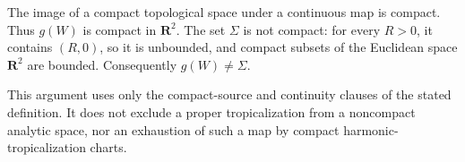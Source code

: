 The image of a compact topological space under a continuous map is compact.
Thus \(g(W)\) is compact in \(\mathbf R^2\).  The set \(\Sigma\) is not
compact: for every \(R>0\), it contains \((R,0)\), so it is unbounded, and
compact subsets of the Euclidean space \(\mathbf R^2\) are bounded.
Consequently \(g(W)\neq\Sigma\).

This argument uses only the compact-source and continuity clauses of the
stated definition.  It does not exclude a proper tropicalization from a
noncompact analytic space, nor an exhaustion of such a map by compact
harmonic-tropicalization charts.
